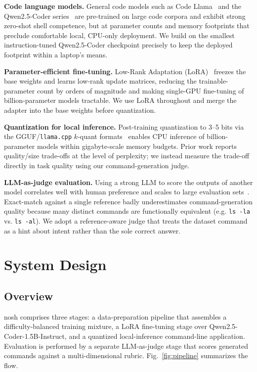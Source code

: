 \documentclass[conference]{IEEEtran}
\begin{document}
\textbf{Code language models.} General code models such as Code
Llama~\cite{roziere2023codellama} and the Qwen2.5-Coder
series~\cite{hui2024qwen25coder} are pre-trained on large code corpora and
exhibit strong zero-shot shell competence, but at parameter counts and memory
footprints that preclude comfortable local, CPU-only deployment. We build on the
smallest instruction-tuned Qwen2.5-Coder checkpoint precisely to keep the
deployed footprint within a laptop's means.

\textbf{Parameter-efficient fine-tuning.} Low-Rank Adaptation
(LoRA)~\cite{hu2022lora} freezes the base weights and learns low-rank update
matrices, reducing the trainable-parameter count by orders of magnitude and
making single-GPU fine-tuning of billion-parameter models tractable. We use LoRA
throughout and merge the adapter into the base weights before quantization.

\textbf{Quantization for local inference.} Post-training quantization to 3--5
bits via the GGUF/\texttt{llama.cpp} $k$-quant formats~\cite{llamacpp} enables
CPU inference of billion-parameter models within gigabyte-scale memory budgets.
Prior work reports quality/size trade-offs at the level of perplexity; we instead
measure the trade-off directly in task quality using our command-generation
judge.

\textbf{LLM-as-judge evaluation.} Using a strong LLM to score the outputs of
another model correlates well with human preference and scales to large
evaluation sets~\cite{zheng2023judge}. Exact-match against a single reference
badly underestimates command-generation quality because many distinct commands
are functionally equivalent (e.g. \texttt{ls -la} vs. \texttt{ls -al}). We adopt
a reference-aware judge that treats the dataset command as a hint about intent
rather than the sole correct answer.

\section{System Design}

\subsection{Overview}

nosh comprises three stages: a data-preparation pipeline that assembles a
difficulty-balanced training mixture, a LoRA fine-tuning stage over
Qwen2.5-Coder-1.5B-Instruct, and a quantized local-inference command-line
application. Evaluation is performed by a separate LLM-as-judge stage that scores
generated commands against a multi-dimensional rubric. Fig.~\ref{fig:pipeline}
summarizes the flow.
\end{document}
